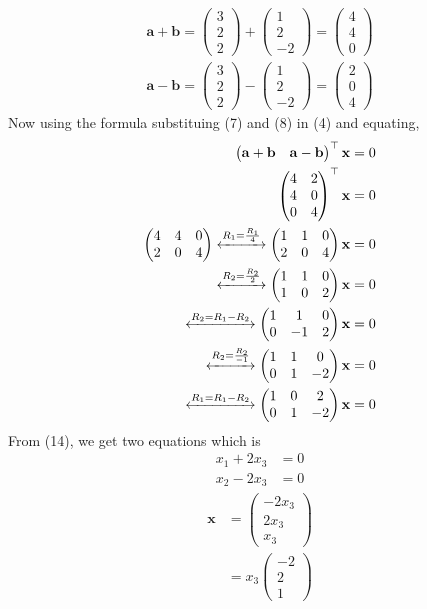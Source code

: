\documentclass[12pt]{article}
\newcommand{\myvec}[1]{\ensuremath{\begin{pmatrix}#1\end{pmatrix}}}
\let\vec\mathbf
\begin{document}
\begin{enumerate}
\begin{align}
\vec{a+b}=\myvec{3\\2\\2}+\myvec{1\\2\\-2}=\myvec{4\\4\\0}\label{7}\\
\vec{a-b}=\myvec{3\\2\\2}-\myvec{1\\2\\-2}=\myvec{2\\0\\4}\label{8}
\end{align}
Now using the formula substituing (7) and (8) in (4) and equating,
\begin{align}
\myvec{\vec{a}+\vec{b}& \vec{a}-\vec{b}}^\top\vec{x}&=0\\
\myvec{
4&2\\
4&0\\
0&4
}^\top \vec{x}&=0\\
\myvec{
4&4&0\\
2&0&4
}
\xleftrightarrow[]{R_1=\frac{R_1}{4}}
\myvec{
1&1&0\\
2&0&4
}\vec{x}&=0\\\xleftrightarrow[]{R_2=\frac{R_2}{2}}
\myvec{
1&1&0\\
1&0&2
}\vec{x}&=0\\
\xleftrightarrow[]{R_2={R_1}-{R_2}}
\myvec{
1&1&0\\
0&-1&2
}\vec{x}&=0\\
\xleftrightarrow[]{R_2=\frac{R_2}{-1}}
\myvec{
1&1&0\\
0&1&-2
}\vec{x}&=0\\
\xleftrightarrow[]{R_1={R_1}-{R_2}}
\myvec{
1&0&2\\
0&1&-2
}\vec{x}&=0\label{14}
\end{align}
From (14), we get two equations which is 
\begin{align}
x_1+2x_3&=0\\
x_2-2x_3&=0
\end{align}
\begin{align}
\vec{x}&=\myvec{-2x_3\\2x_3\\x_3}\\
&=x_3\myvec{-2\\2\\1}
\end{align}
\end{enumerate} 
\end{document}
